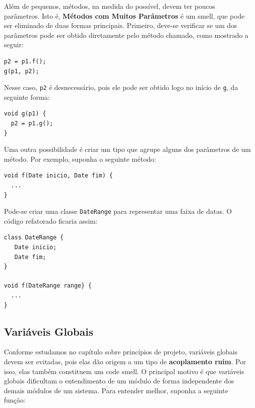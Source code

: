 \documentclass[
  11pt,
  twoside]{book}
\newcommand{\passthrough}[1]{#1}
\begin{document}

Além de pequenos, métodos, na medida do possível, devem ter poucos
parâmetros. Isto é, \textbf{Métodos com Muitos Parâmetros} é um smell,
que pode ser eliminado de duas formas principais. Primeiro, deve-se
verificar se um dos parâmetros pode ser obtido diretamente pelo método
chamado, como mostrado a seguir:

\begin{lstlisting}
p2 = p1.f();
g(p1, p2);
\end{lstlisting}

Nesse caso, \passthrough{\lstinline!p2!} é desnecessário, pois ele pode
ser obtido logo no início de \passthrough{\lstinline!g!}, da seguinte
forma:

\begin{lstlisting}
void g(p1) {
  p2 = p1.g();
}
\end{lstlisting}

Uma outra possibilidade é criar um tipo que agrupe alguns dos parâmetros
de um método. Por exemplo, suponha o seguinte método:

\begin{lstlisting}
void f(Date inicio, Date fim) {
  ...
}
\end{lstlisting}

Pode-se criar uma classe \passthrough{\lstinline!DateRange!} para
representar uma faixa de datas. O código refatorado ficaria assim:

\newpage

\begin{lstlisting}
class DateRange {
   Date inicio;
   Date fim;
}

void f(DateRange range} {
  ...
}
\end{lstlisting}

\hypertarget{variuxe1veis-globais}{%
\subsection{Variáveis Globais}\label{variuxe1veis-globais}}

 

Conforme estudamos no capítulo sobre princípios de projeto, variáveis
globais devem ser evitadas, pois elas dão origem a um tipo de
\textbf{acoplamento ruim}. Por isso, elas também constituem um code
smell. O principal motivo é que variáveis globais dificultam o
entendimento de um módulo de forma independente dos demais módulos de um
sistema. Para entender melhor, suponha a seguinte função:
\end{document}
